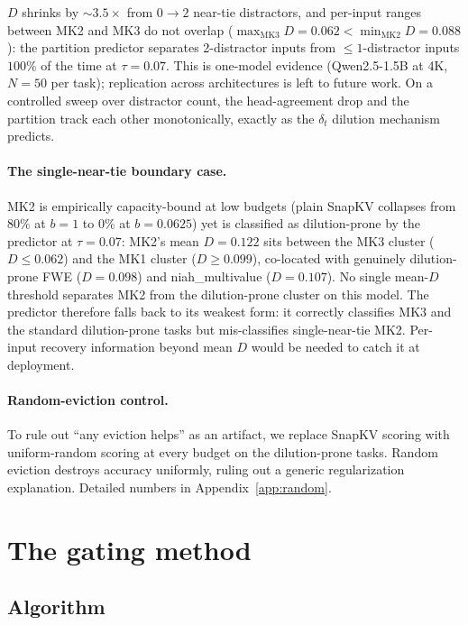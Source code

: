\documentclass{article} %
\begin{document}
$D$ shrinks by $\sim 3.5\times$ from $0 \to 2$ near-tie distractors,
and per-input ranges between MK2 and MK3 do not overlap
($\max_{\text{MK3}} D = 0.062 < \min_{\text{MK2}} D = 0.088$): the
partition predictor separates 2-distractor inputs from
$\leq 1$-distractor inputs $100\%$ of the time at $\tau = 0.07$. This
is one-model evidence (Qwen2.5-1.5B at 4K, $N = 50$ per task);
replication across architectures is left to future work. On a
controlled sweep over distractor count, the head-agreement drop and
the partition track each other monotonically, exactly as the
$\delta_t$ dilution mechanism predicts.

\paragraph{The single-near-tie boundary case.} MK2 is empirically
capacity-bound at low budgets (plain SnapKV collapses from $80\%$ at
$b{=}1$ to $0\%$ at $b{=}0.0625$) yet is classified as dilution-prone
by the predictor at $\tau = 0.07$: MK2's mean $D = 0.122$ sits between
the MK3 cluster ($D \leq 0.062$) and the MK1 cluster ($D \geq 0.099$),
co-located with genuinely dilution-prone FWE ($D = 0.098$) and
niah\_multivalue ($D = 0.107$). No single mean-$D$ threshold separates
MK2 from the dilution-prone cluster on this model. The predictor
therefore falls back to its weakest form: it correctly classifies MK3
and the standard dilution-prone tasks but mis-classifies single-near-tie
MK2. Per-input recovery information beyond mean $D$ would be needed to
catch it at deployment.

\paragraph{Random-eviction control.} To rule out ``any eviction helps'' as an
artifact, we replace SnapKV scoring with uniform-random scoring at every
budget on the dilution-prone tasks. Random eviction destroys accuracy uniformly,
ruling out a generic regularization explanation. Detailed numbers in
Appendix~\ref{app:random}.

\section{The gating method}
\label{sec:method}

\subsection{Algorithm}
\label{subsec:algo}
\end{document}
